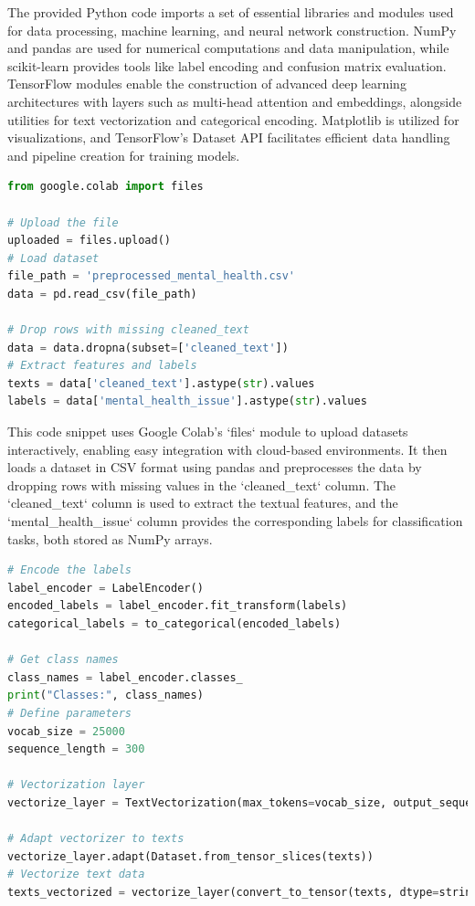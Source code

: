 \noindent
The provided Python code imports a set of essential libraries and modules used for data processing, machine learning, and neural network construction. NumPy and pandas are used for numerical computations and data manipulation, while scikit-learn provides tools like label encoding and confusion matrix evaluation. TensorFlow modules enable the construction of advanced deep learning architectures with layers such as multi-head attention and embeddings, alongside utilities for text vectorization and categorical encoding. Matplotlib is utilized for visualizations, and TensorFlow's Dataset API facilitates efficient data handling and pipeline creation for training models.

\begin{tcolorbox}[colback=gray!5!white, colframe=gray!80!black, boxrule=0.5pt, title=Load Dataset]
    \begin{lstlisting}[language=Python]
from google.colab import files

# Upload the file
uploaded = files.upload()
# Load dataset
file_path = 'preprocessed_mental_health.csv'
data = pd.read_csv(file_path)

# Drop rows with missing cleaned_text
data = data.dropna(subset=['cleaned_text'])
# Extract features and labels
texts = data['cleaned_text'].astype(str).values
labels = data['mental_health_issue'].astype(str).values
    \end{lstlisting}
\end{tcolorbox}

\noindent
This code snippet uses Google Colab's `files` module to upload datasets interactively, enabling easy integration with cloud-based environments. It then loads a dataset in CSV format using pandas and preprocesses the data by dropping rows with missing values in the `cleaned\_text` column. The `cleaned\_text` column is used to extract the textual features, and the `mental\_health\_issue` column provides the corresponding labels for classification tasks, both stored as NumPy arrays.

\begin{tcolorbox}[colback=gray!5!white, colframe=gray!80!black, boxrule=0.5pt, title=Processing Labels and Text Vectorization]
    \begin{lstlisting}[language=Python]
# Encode the labels
label_encoder = LabelEncoder()
encoded_labels = label_encoder.fit_transform(labels)
categorical_labels = to_categorical(encoded_labels)

# Get class names
class_names = label_encoder.classes_
print("Classes:", class_names)
# Define parameters
vocab_size = 25000
sequence_length = 300

# Vectorization layer
vectorize_layer = TextVectorization(max_tokens=vocab_size, output_sequence_length=sequence_length)

# Adapt vectorizer to texts
vectorize_layer.adapt(Dataset.from_tensor_slices(texts))
# Vectorize text data
texts_vectorized = vectorize_layer(convert_to_tensor(texts, dtype=string))
    \end{lstlisting}
\end{tcolorbox}

